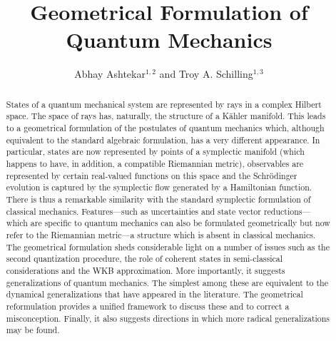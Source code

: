 \documentclass[12pt,aps,eqsecnum,tighten,nofootinbib]{revtex4-2}
\begin{document}

\title{Geometrical Formulation of Quantum Mechanics}
\author{Abhay Ashtekar${}^{1,2}$ and Troy A. Schilling${}^{1,3}$}

\address{${}^1$ Center for Gravitational Physics and Geometry\\
Department of Physics, Penn State, 
University Park, PA 16802-6300, USA}
 
\address{${}^2$ Erwin Schr\"odinger International Institute for 
Mathematical Physics\\
Boltzmanngasse 9, A-1090 Vienna, Austria}

\address{${}^3$ Institute for Defense Analyses\\
1801 North Beauregard Street, Alexandria, VA 22311-1772}


\begin{abstract}
States of a quantum mechanical system are represented by rays in a
complex Hilbert space. The space of rays has, naturally, the structure
of a K\"ahler manifold. This leads to a geometrical formulation of the
postulates of quantum mechanics which, although equivalent to the
standard algebraic formulation, has a very different appearance.  In
particular, states are now represented by points of a symplectic
manifold (which happens to have, in addition, a compatible Riemannian
metric), observables are represented by certain real-valued functions
on this space and the Schr\"odinger evolution is captured by the
symplectic flow generated by a Hamiltonian function. There is thus a
remarkable similarity with the standard symplectic formulation of
classical mechanics. Features---such as uncertainties and state vector
reductions---which are specific to quantum mechanics can also be
formulated geometrically but now refer to the Riemannian metric---a
structure which is absent in classical mechanics. The geometrical
formulation sheds considerable light on a number of issues such as the
second quantization procedure, the role of coherent states in
semi-classical considerations and the WKB approximation.  More
importantly, it suggests generalizations of quantum mechanics. The
simplest among these are equivalent to the dynamical generalizations
that have appeared in the literature. The geometrical reformulation
provides a unified framework to discuss these and to correct a
misconception.  Finally, it also suggests directions in which more
radical generalizations may be found.  
\end{abstract}

\maketitle
\end{document}
